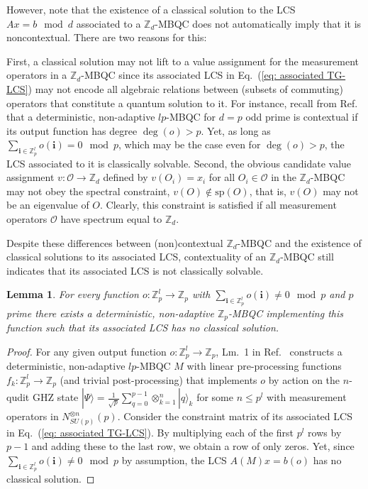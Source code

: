 \documentclass[aps,pra,letterpaper,onrcolumn,nofootinbib,notitlepage,longbibliography]{revtex4-1}
\newtheorem{lemma}{Lemma}
\newcommand{\ra}{\ensuremath{\rightarrow}}
\newcommand{\zz}{\mathbb Z}
\newcommand{\bi}{\mathbf{i}}
\newcommand\mc[1]{\mathcal{#1}}
\newcommand{\cO}{\mc{O}}
\begin{document}
However, note that the existence of a classical solution to the LCS $Ax=b\mod d$ associated to a $\zz_d$-MBQC does not automatically imply that it is noncontextual. There are two reasons for this:

First, a classical solution may not lift to a value assignment for the measurement operators in a $\zz_d$-MBQC since its associated LCS in Eq.~(\ref{eq: associated TG-LCS}) may not encode all algebraic relations between (subsets of commuting) operators that constitute a quantum solution to it. For instance, recall from Ref.~\cite{FrembsRobertsBartlett2018} that a deterministic, non-adaptive $lp$-MBQC for $d=p$ odd prime is contextual if its output function has degree $\deg(o)>p$. Yet, as long as $\sum_{\bi\in\zz^l_p}o(\bi)=0 \mod p$, which may be the case even for $\deg(o)>p$, the LCS associated to it is classically solvable. Second, the obvious candidate value assignment $v:\cO\ra\zz_d$ defined by $v(O_i)=x_i$ for all $O_i\in\cO$ in the $\zz_d$-MBQC may not obey the spectral constraint, $v(O)\notin\mathrm{sp}(O)$, that is, $v(O)$ may not be an eigenvalue of $O$. Clearly, this constraint is satisfied if all measurement operators $\cO$ have spectrum equal to $\zz_d$.

Despite these differences between (non)contextual $\zz_d$-MBQC and the existence of classical solutions to its associated LCS, contextuality of an $\zz_d$-MBQC still indicates that its associated LCS is not classically solvable.

\begin{lemma}\label{lm: contextual solution}
    For every function $o: \zz^l_p\ra\zz_p$ with $\sum_{\bi\in\zz^l_p}o(\bi)\neq 0 \mod p$ and $p$ prime there exists a deterministic, non-adaptive $\zz_p$-MBQC implementing this function such that its associated LCS has no classical solution.
\end{lemma}

\begin{proof}
    For any given output function $o:\zz^l_p\ra\zz_p$, Lm.~1 in Ref.~\cite{FrembsRobertsCampbellBartlett2022} constructs a deterministic, non-adaptive $lp$-MBQC $M$ with linear pre-processing functions $f_k:\zz^l_p\ra\zz_p$ (and trivial post-processing) that implements $o$ by action on the $n$-qudit GHZ state $|\Psi\rangle=\frac{1}{\sqrt{p}}\sum_{q=0}^{p-1} \otimes_{k=1}^n|q\rangle_k$ for some $n\leq p^l$ with measurement operators in $N^{\otimes n}_{SU(p)}(p)$. Consider the constraint matrix of its associated LCS in Eq.~(\ref{eq: associated TG-LCS}). By multiplying each of the first $p^l$ rows by $p-1$ and adding these to the last row, we obtain a row of only zeros. Yet, since $\sum_{\bi\in\zz^l_p} o(\bi)\neq 0\mod p$ by assumption, the LCS $A(M)x=b(o)$ has no classical solution.
\end{proof}
\end{document}
